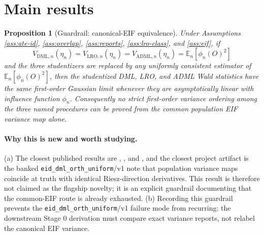 \documentclass[11pt]{article}
\newcommand{\E}{\mathbb{E}}
\theoremstyle{definition}
\theoremstyle{plain}
\newtheorem{proposition}{Proposition}
\theoremstyle{remark}
\begin{document}
\section{Main results}
\begin{proposition}[Guardrail: canonical-EIF equivalence]\label{prop:eif-no-go}
Under Assumptions \ref{ass:ate-id}, \ref{ass:overlap}, \ref{ass:reports},
\ref{ass:lro-class}, and \ref{ass:eif}, if
\[
V_{\mathrm{DML},n}(\eta_n)=V_{\mathrm{LRO},n}(\eta_n)
=V_{\mathrm{ADML},n}(\eta_n)=\E_n[\phi_n(O)^2]
\]
and the three studentizers are replaced by any uniformly consistent estimator
of \(\E_n[\phi_n(O)^2]\), then the studentized DML, LRO, and ADML Wald
statistics have the same first-order Gaussian limit whenever they are
asymptotically linear with influence function \(\phi_n\).  Consequently no
strict first-order variance ordering among the three named procedures can be
proved from the common population EIF variance map alone.
\end{proposition}
\paragraph{Why this is new and worth studying.}
(a) The closest published results are \citet{Newey1994Econometrica},
\citet{ChernozhukovEtAl2018ECTJ}, and \citet{ChernozhukovNeweySingh2022ADML},
and the closest project artifact is the banked \texttt{eid\_dml\_orth\_uniform}/v1
note that population variance maps coincide at truth with identical
Riesz-direction derivatives.  This result is therefore not claimed as the
flagship novelty; it is an explicit guardrail documenting that the common-EIF
route is already exhausted.  (b) Recording this guardrail prevents the
\texttt{eid\_dml\_orth\_uniform}/v1 failure mode from recurring: the
downstream Stage 0 derivation must compare exact variance reports, not relabel
the canonical EIF variance.
\end{document}

